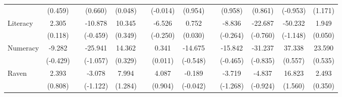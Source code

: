 \begin{table}[htbp]
{\begin{tabular}{lcccccccccccc}
          & (0.459) &       & (0.660) & (0.048) &       & (-0.014) & (0.954) &       & (0.958) & (0.861) & (-0.953) & (1.171) \\
    Literacy & 2.305 &       & -10.878 & 10.345 &       & -6.526 & 0.752 &       & -8.836 & -22.687 & -50.232 & 1.949 \\
          & (0.118) &       & (-0.459) & (0.349) &       & (-0.250) & (0.030) &       & (-0.264) & (-0.760) & (-1.148) & (0.050) \\
    Numeracy & -9.282 &       & -25.941 & 14.362 &       & 0.341 & -14.675 &       & -15.842 & -31.237 & 37.338 & 23.590 \\
          & (-0.429) &       & (-1.057) & (0.329) &       & (0.011) & (-0.548) &       & (-0.465) & (-0.835) & (0.557) & (0.535) \\
    Raven & 2.393 &       & -3.078 & 7.994 &       & 4.087 & -0.189 &       & -3.719 & -4.837 & 16.823 & 2.493 \\
          & (0.808) &       & (-1.122) & (1.284) &       & (0.904) & (-0.042) &       & (-1.268) & (-0.924) & (1.560) & (0.350) \\


\end{tabular}}
\end{table}
